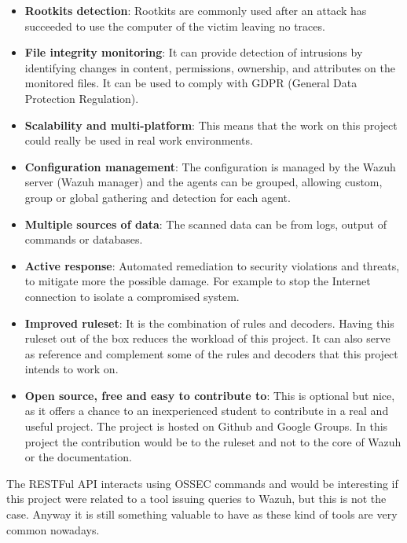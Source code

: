 \begin{itemize}
	\item \textbf{Rootkits detection}: Rootkits are commonly used after an attack has succeeded to use the computer of the victim leaving no traces.
	\item \textbf{File integrity monitoring}: It can provide detection of intrusions by identifying changes in content, permissions, ownership, and attributes on the monitored files. It can be used to comply with GDPR (General Data Protection Regulation).
	\item \textbf{Scalability and multi-platform}: This means that the work on this project could really be used in real work environments.
	\item \textbf{Configuration management}: The configuration is managed by the Wazuh server (Wazuh manager) and the agents can be grouped, allowing custom, group or global gathering and detection for each agent.
	\item \textbf{Multiple sources of data}: The scanned data can be from logs, output of commands or databases. %
	\item \textbf{Active response}: Automated remediation to security violations and threats, to mitigate more the possible damage. For example to stop the Internet connection to isolate a compromised system.
	\item \textbf{Improved ruleset}: It is the combination of rules and decoders. Having this ruleset out of the box reduces the workload of this project. It can also serve as reference and complement some of the rules and decoders that this project intends to work on.
	\item \textbf{Open source, free and easy to contribute to}: This is optional but nice, as it offers a chance to an inexperienced student to contribute in a real and useful project. The project is hosted on Github and Google Groups. In this project the contribution would be to the ruleset\cite{wazuh_ruleset} and not to the core of Wazuh\cite{wazuh} or the documentation\cite{wazuh_documentation2}.
\end{itemize}
\linej
The RESTFul API interacts using OSSEC commands and would be interesting if this project were related to a tool issuing queries to Wazuh, but this is not the case. Anyway it is still something valuable to have as these kind of tools are very common nowadays.

